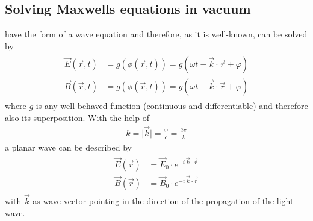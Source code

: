 \subsection{Solving Maxwells equations in vacuum}\label{sec::SolvMaxEqVac}
%
 have the form of a wave equation and therefore, as it is well-known, can be solved by
%
\begin{align}
\begin{split} \label{eq::dgl_solution}
  \vec{E}( \vec{r}, t ) &= g(\phi( \vec{r}, t )) = g( \omega t - \vec{k} \cdot \vec{r} + \varphi)\\
  \vec{B}( \vec{r}, t ) &= g(\phi( \vec{r}, t )) = g( \omega t - \vec{k} \cdot \vec{r} + \varphi )
\end{split}
\end{align}
%
where $g$ is any well-behaved function (continuous and differentiable) and therefore also its superposition.
%
With the help of
%
\begin{align}
k = \mathopen| \vec{k} \mathclose| = \frac{\omega}{c} =  \frac{2 \pi}{\lambda}
\end{align}
%
a planar wave can be described by
%
\begin{align}
\begin{split} \label{eq::plane_wave}
\vec{E}(\vec{r}) &= \vec{E}_0 \cdot e^{ -i \, \vec{k} \cdot \vec{r} }\\
 \vec{B}(\vec{r}) &= \vec{B}_0 \cdot e^{ -i \, \vec{k} \cdot \vec{r} }
\end{split}
\end{align}
%
with $\vec{k}$ as wave vector pointing in the direction of the propagation of the light wave.
%
%
